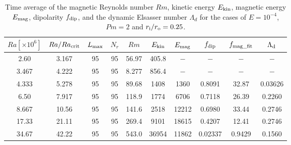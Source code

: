 \begin{table*}
\caption{Time average of the magnetic Reynolds number $Rm$, kinetic energy $E_{\rm kin}$, magnetic energy $E_{\rm mag}$, dipolarity $f_{\rm dip}$, and the dynamic Elsasser number $\Lambda_{d}$ for the cases of $E = 10^{-4}$, $Pm = 2$ and $r_{\rm i}/r_{\rm o} = 0.25$.}
  \begin{tabular}{cccccccccc}
    \hline
     $Ra[\times 10^6]$  &  $Ra/Ra_{\rm crit}$& 
     $L_{\rm max}$ & $N_{r}$ & $Rm$ 
     & $E_{\rm kin}$  &  $E_{\rm mag}$ & $f_{\rm dip}$ & $f_{\rm mag\_fit}$ & $\Lambda_{\rm d}$\\
    \hline
      2.60 & 3.167 & 95 & 95 & 56.97 & 405.8 & $-$ & $-$ & $-$ & $-$ \\
      3.467 & 4.222 & 95 & 95 & 8.277 & 856.4 & $-$ & $-$ & $-$ & $-$ \\
      4.333 & 5.278 & 95 & 95 & 89.68 & 1408 & 1360 & 0.8091 & 32.87 & 0.03626 \\
      6.50 & 7.917 & 95 & 95 & 118.9 & 1774 & 6706 & 0.7118 & 26.39 & 0.2260 \\
      8.667 & 10.56 & 95 & 95 & 141.6 & 2518 & 12212 & 0.6980 & 33.44 & 0.2746 \\
      17.33 & 21.11 & 95 & 95 & 269.4 & 9101 & 18615 & 0.4207 & 12.41 & 0.2746 \\
      34.67 & 42.22 & 95 & 95 & 543.0 & 36954 & 11862 & 0.02337 & 0.9429 & 0.1560 \\
    \hline
  \end{tabular}
\label{table:Summary_25_Ek4}
\end{table*}